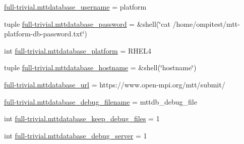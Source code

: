 \begin{DoxyCompactItemize}
$$\hyperlink{namespacefull-trivial_a2556ba8e56d9edb19b2a7dcff147fd83}{full-\/trivial.\-mttdatabase\-\_\-username} = platform
\item 
tuple \hyperlink{namespacefull-trivial_a00ca0a7632b4a85ca5df552bc984a77d}{full-\/trivial.\-mttdatabase\-\_\-password} = \&shell(\char`\"{}cat /home/ompitest/mtt-\/platform-\/db-\/password.\-txt\char`\"{})
\item 
int \hyperlink{namespacefull-trivial_a7435f3a6cf574a375aa8cb9b7b2fe162}{full-\/trivial.\-mttdatabase\-\_\-platform} = R\-H\-E\-L4
\item 
tuple \hyperlink{namespacefull-trivial_a774cf7cf721e8c1716122a628a72e4f8}{full-\/trivial.\-mttdatabase\-\_\-hostname} = \&shell(\char`\"{}hostname\char`\"{})
\item 
\hyperlink{namespacefull-trivial_a1e6b981d941fc6b728d6faae8632e225}{full-\/trivial.\-mttdatabase\-\_\-url} = https\-://www.\-open-\/mpi.\-org/mtt/submit/
\item 
\hyperlink{namespacefull-trivial_a5a952dcadcccb56251a2745399a467c5}{full-\/trivial.\-mttdatabase\-\_\-debug\-\_\-filename} = mttdb\-\_\-debug\-\_\-file
\item 
int \hyperlink{namespacefull-trivial_ad2a2564c1ae95fb67eda20314bac44f5}{full-\/trivial.\-mttdatabase\-\_\-keep\-\_\-debug\-\_\-files} = 1
\item 
int \hyperlink{namespacefull-trivial_a6ed803b39509a0e919f4f11063cb5209}{full-\/trivial.\-mttdatabase\-\_\-debug\-\_\-server} = 1
\end{DoxyCompactItemize}
